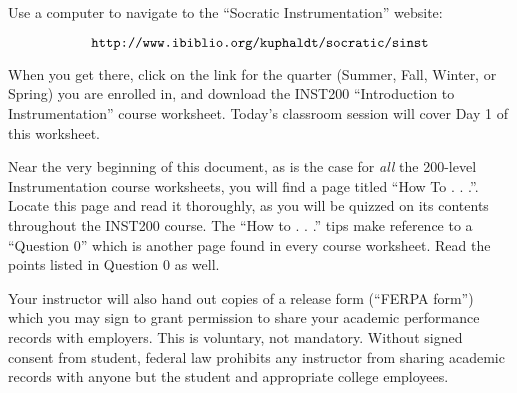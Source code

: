 
Use a computer to navigate to the ``Socratic Instrumentation'' website:

$$\hbox{\tt http://www.ibiblio.org/kuphaldt/socratic/sinst}$$

When you get there, click on the link for the quarter (Summer, Fall, Winter, or Spring) you are enrolled in, and download the INST200 ``Introduction to Instrumentation'' course worksheet.  Today's classroom session will cover Day 1 of this worksheet.

\vskip 10pt

Near the very beginning of this document, as is the case for {\it all} the 200-level Instrumentation course worksheets, you will find a page titled ``How To . . .''.  Locate this page and read it thoroughly, as you will be quizzed on its contents throughout the INST200 course.  The ``How to . . .'' tips make reference to a ``Question 0'' which is another page found in every course worksheet.  Read the points listed in Question 0 as well.



\vskip 10pt

Your instructor will also hand out copies of a release form (``FERPA form'') which you may sign to grant permission to share your academic performance records with employers.  This is voluntary, not mandatory.  Without signed consent from student, federal law prohibits any instructor from sharing academic records with anyone but the student and appropriate college employees.

